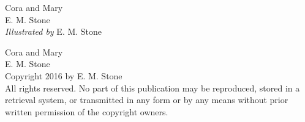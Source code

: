\documentclass[12pt]{extbook}
\newcommand\blankpage{%
    \null
    \thispagestyle{empty}%
    \addtocounter{page}{-1}%
    \newpage}
\begin{document}



  \pagestyle{empty}
  \vspace*{\fill}
  \begin{center}

  \end{center}
  \vspace*{\fill}

  \begin{titlepage}
    \vspace*{\fill}
    \begin{center}
      \huge{Cora and Mary}\\[0.5cm]
      \large {E. M. Stone}\\[0.4cm]
      \large {\textit{Illustrated by} E. M. Stone}\\[0.4cm]
    \end{center}
    \vspace*{\fill}
  \end{titlepage}
  
  \begingroup
  \footnotesize
  \parindent 0pt
  \parskip \baselineskip
  \vfill
  Cora and Mary \\
  E. M. Stone \\


  Copyright \textcopyright{} 2016 by E. M. Stone \\
  
  All rights reserved. No part of this publication may be reproduced, stored in a retrieval system, or transmitted in any form or by any means without prior written permission of the copyright owners. 
  
\end{document}
